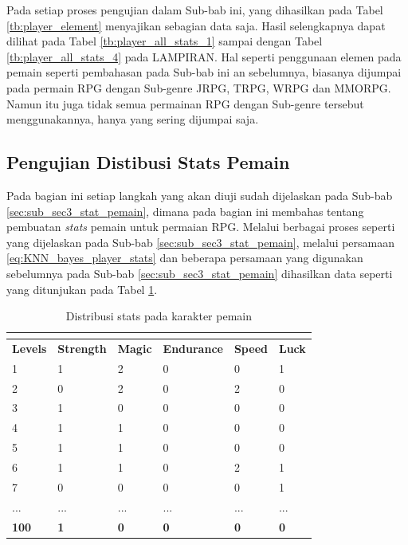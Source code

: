 Pada setiap proses pengujian dalam Sub-bab ini, yang dihasilkan pada Tabel \ref{tb:player_element} menyajikan sebagian data saja. Hasil selengkapnya dapat dilihat pada Tabel \ref{tb:player_all_stats_1} sampai dengan Tabel \ref{tb:player_all_stats_4} pada LAMPIRAN. Hal seperti penggunaan elemen pada pemain seperti pembahasan pada Sub-bab ini an sebelumnya, biasanya dijumpai pada permain RPG dengan Sub-genre JRPG, TRPG, WRPG dan MMORPG. Namun itu juga tidak semua permainan RPG dengan Sub-genre tersebut menggunakannya, hanya yang sering dijumpai saja.
\vspace{1ex}

\subsection{Pengujian Distibusi Stats Pemain}
\label{sec:sub_sec4_eval_single-character_stats}
\vspace{1ex}

Pada bagian ini setiap langkah yang akan diuji sudah dijelaskan pada Sub-bab \ref{sec:sub_sec3_stat_pemain}, dimana pada bagian ini membahas tentang pembuatan \textit{stats} pemain untuk permaian RPG. Melalui berbagai proses seperti yang dijelaskan pada Sub-bab \ref{sec:sub_sec3_stat_pemain}, melalui persamaan \ref{eq:KNN_bayes_player_stats} dan beberapa persamaan yang digunakan sebelumnya pada Sub-bab \ref{sec:sub_sec3_stat_pemain} dihasilkan data seperti yang ditunjukan pada Tabel \ref{tb:player_battle_stats}.
\vspace{-1ex}

\begin{longtable}{|l|l|l|l|l|l|}
	\caption{Distribusi stats pada karakter pemain}
	\vspace{1ex}
	\label{tb:player_battle_stats}\\
	\hline
	\rowcolor[HTML]{C0C0C0} 
	\textbf{Levels} & \textbf{Strength} & \textbf{Magic} & \textbf{Endurance} & \textbf{Speed} & \textbf{Luck} \\ \hline
	1 & 1 & 2 & 0 & 0 & 1 \\ \hline
	2 & 0 & 2 & 0 & 2 & 0 \\ \hline
	3 & 1 & 0 & 0 & 0 & 0 \\ \hline
	4 & 1 & 1 & 0 & 0 & 0 \\ \hline
	5 & 1 & 1 & 0 & 0 & 0 \\ \hline
	6 & 1 & 1 & 0 & 2 & 1 \\ \hline
	7 & 0 & 0 & 0 & 0 & 1 \\ \hline
	... & ... & ... & ... & ... & ... \\ \hline
	\textbf{100} & \textbf{1} & \textbf{0} & \textbf{0} & \textbf{0} & \textbf{0} \\ \hline
\end{longtable}
\vspace{1ex}

